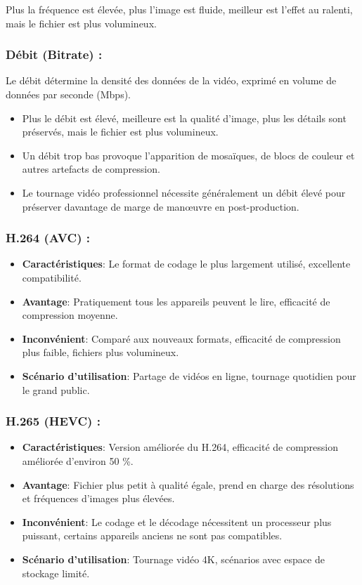 Plus la fréquence est élevée, plus l'image est fluide, meilleur est l'effet au ralenti, mais le fichier est plus volumineux.

\subsubsection*{Débit (Bitrate) :}

Le débit détermine la densité des données de la vidéo, exprimé en volume de données par seconde (Mbps).

\begin{itemize}
  \item Plus le débit est élevé, meilleure est la qualité d'image, plus les détails sont préservés, mais le fichier est plus volumineux.
  \item Un débit trop bas provoque l'apparition de mosaïques, de blocs de couleur et autres artefacts de compression.
  \item Le tournage vidéo professionnel nécessite généralement un débit élevé pour préserver davantage de marge de manœuvre en post-production.
\end{itemize}


\subsubsection*{H.264 (AVC) :}

\begin{itemize}
  \item \textbf{Caractéristiques}: Le format de codage le plus largement utilisé, excellente compatibilité.
  \item \textbf{Avantage}: Pratiquement tous les appareils peuvent le lire, efficacité de compression moyenne.
  \item \textbf{Inconvénient}: Comparé aux nouveaux formats, efficacité de compression plus faible, fichiers plus volumineux.
  \item \textbf{Scénario d'utilisation}: Partage de vidéos en ligne, tournage quotidien pour le grand public.
\end{itemize}

\subsubsection*{H.265 (HEVC) :}

\begin{itemize}
  \item \textbf{Caractéristiques}: Version améliorée du H.264, efficacité de compression améliorée d'environ 50 \%.
  \item \textbf{Avantage}: Fichier plus petit à qualité égale, prend en charge des résolutions et fréquences d'images plus élevées.
  \item \textbf{Inconvénient}: Le codage et le décodage nécessitent un processeur plus puissant, certains appareils anciens ne sont pas compatibles.
  \item \textbf{Scénario d'utilisation}: Tournage vidéo 4K, scénarios avec espace de stockage limité.
\end{itemize}

